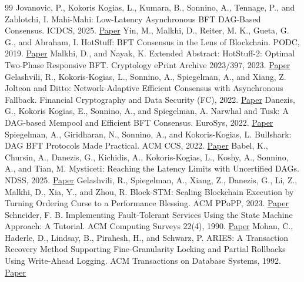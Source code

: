 \documentclass[11pt]{article}
\begin{document}
\begin{thebibliography}{99}
 Jovanovic, P., Kokoris Kogias, L., Kumara, B., Sonnino, A., Tennage, P., and Zablotchi, I. Mahi-Mahi: Low-Latency Asynchronous BFT DAG-Based Consensus. ICDCS, 2025. \href{https://doi.org/10.1109/ICDCS63083.2025.00060}{Paper}
 Yin, M., Malkhi, D., Reiter, M. K., Gueta, G. G., and Abraham, I. HotStuff: BFT Consensus in the Lens of Blockchain. PODC, 2019. \href{https://arxiv.org/abs/1803.05069v6}{Paper}
 Malkhi, D., and Nayak, K. Extended Abstract: HotStuff-2: Optimal Two-Phase Responsive BFT. Cryptology ePrint Archive 2023/397, 2023. \href{https://eprint.iacr.org/2023/397}{Paper}
 Gelashvili, R., Kokoris-Kogias, L., Sonnino, A., Spiegelman, A., and Xiang, Z. Jolteon and Ditto: Network-Adaptive Efficient Consensus with Asynchronous Fallback. Financial Cryptography and Data Security (FC), 2022. \href{https://fc22.ifca.ai/preproceedings/35.pdf}{Paper}
 Danezis, G., Kokoris Kogias, E., Sonnino, A., and Spiegelman, A. Narwhal and Tusk: A DAG-based Mempool and Efficient BFT Consensus. EuroSys, 2022. \href{https://arxiv.org/abs/2105.11827v4}{Paper}
 Spiegelman, A., Giridharan, N., Sonnino, A., and Kokoris-Kogias, L. Bullshark: DAG BFT Protocols Made Practical. ACM CCS, 2022. \href{https://arxiv.org/abs/2201.05677v3}{Paper}
 Babel, K., Chursin, A., Danezis, G., Kichidis, A., Kokoris-Kogias, L., Koshy, A., Sonnino, A., and Tian, M. Mysticeti: Reaching the Latency Limits with Uncertified DAGs. NDSS, 2025. \href{https://www.ndss-symposium.org/ndss-paper/mysticeti-reaching-the-latency-limits-with-uncertified-dags/}{Paper}
 Gelashvili, R., Spiegelman, A., Xiang, Z., Danezis, G., Li, Z., Malkhi, D., Xia, Y., and Zhou, R. Block-STM: Scaling Blockchain Execution by Turning Ordering Curse to a Performance Blessing. ACM PPoPP, 2023. \href{https://arxiv.org/abs/2203.06871v3}{Paper}
 Schneider, F. B. Implementing Fault-Tolerant Services Using the State Machine Approach: A Tutorial. ACM Computing Surveys 22(4), 1990. \href{https://www.cs.cornell.edu/fbs/publications/SMSurvey.pdf}{Paper}
 Mohan, C., Haderle, D., Lindsay, B., Pirahesh, H., and Schwarz, P. ARIES: A Transaction Recovery Method Supporting Fine-Granularity Locking and Partial Rollbacks Using Write-Ahead Logging. ACM Transactions on Database Systems, 1992. \href{https://research.ibm.com/publications/aries-a-transaction-recovery-method-supporting-fine-granularity-locking-and-partial-rollbacks-using-write-ahead-logging}{Paper}

\end{thebibliography}
\end{document}
